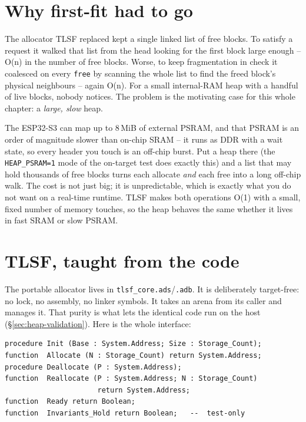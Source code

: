 \section{Why first-fit had to go}

The allocator TLSF replaced kept a single linked list of free blocks. To satisfy
a request it walked that list from the head looking for the first block large
enough -- O(n) in the number of free blocks. Worse, to keep fragmentation in
check it coalesced on every \texttt{free} by scanning the whole list to find the
freed block's physical neighbours -- again O(n). For a small internal-RAM heap
with a handful of live blocks, nobody notices. The problem is the motivating case
for this whole chapter: a \emph{large, slow} heap.

The ESP32-S3 can map up to 8\,MiB of external PSRAM, and that PSRAM is an order of
magnitude slower than on-chip SRAM -- it runs as DDR with a wait state, so every
header you touch is an off-chip burst. Put a heap there (the
\texttt{HEAP\_PSRAM=1} mode of the on-target test does exactly this) and a list
that may hold thousands of free blocks turns each allocate \emph{and} each free
into a long off-chip walk. The cost is not just big; it is unpredictable, which is
exactly what you do not want on a real-time runtime. TLSF makes both operations
O(1) with a small, fixed number of memory touches, so the heap behaves the same
whether it lives in fast SRAM or slow PSRAM.


\section{TLSF, taught from the code}

The portable allocator lives in \texttt{tlsf\_core.ads}/\texttt{.adb}. It is
deliberately target-free: no lock, no assembly, no linker symbols. It takes an
arena from its caller and manages it. That purity is what lets the identical code
run on the host (\S\ref{sec:heap-validation}). Here is the whole interface:

\begin{lstlisting}
procedure Init (Base : System.Address; Size : Storage_Count);
function  Allocate (N : Storage_Count) return System.Address;
procedure Deallocate (P : System.Address);
function  Reallocate (P : System.Address; N : Storage_Count)
                      return System.Address;
function  Ready return Boolean;
function  Invariants_Hold return Boolean;   --  test-only
\end{lstlisting}

